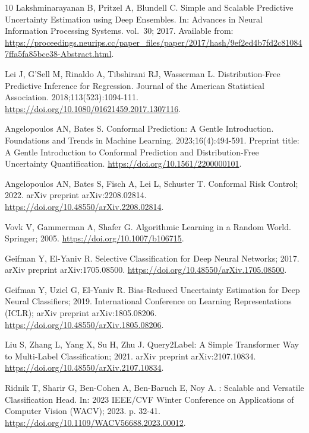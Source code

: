 \begin{thebibliography}{10}
Lakshminarayanan B, Pritzel A, Blundell C.
\newblock Simple and Scalable Predictive Uncertainty Estimation using Deep
  Ensembles.
\newblock In: Advances in Neural Information Processing Systems. vol.~30; 2017.
  Available from:
  \url{https://proceedings.neurips.cc/paper_files/paper/2017/hash/9ef2ed4b7fd2c810847ffa5fa85bce38-Abstract.html}.

Lei J, G'Sell M, Rinaldo A, Tibshirani RJ, Wasserman L.
\newblock Distribution-Free Predictive Inference for Regression.
\newblock Journal of the American Statistical Association.
  2018;113(523):1094-111.
\newblock \url{https://doi.org/10.1080/01621459.2017.1307116}.

Angelopoulos AN, Bates S.
\newblock Conformal Prediction: A Gentle Introduction.
\newblock Foundations and Trends in Machine Learning. 2023;16(4):494-591.
\newblock Preprint title: A Gentle Introduction to Conformal Prediction and
  Distribution-Free Uncertainty Quantification.
\newblock \url{https://doi.org/10.1561/2200000101}.

Angelopoulos AN, Bates S, Fisch A, Lei L, Schuster T. Conformal Risk Control;
  2022.
\newblock arXiv preprint arXiv:2208.02814.
\newblock \url{https://doi.org/10.48550/arXiv.2208.02814}.

Vovk V, Gammerman A, Shafer G.
\newblock Algorithmic Learning in a Random World.
\newblock Springer; 2005.
\newblock \url{https://doi.org/10.1007/b106715}.

Geifman Y, El-Yaniv R. Selective Classification for Deep Neural Networks; 2017.
\newblock arXiv preprint arXiv:1705.08500.
\newblock \url{https://doi.org/10.48550/arXiv.1705.08500}.

Geifman Y, Uziel G, El-Yaniv R. Bias-Reduced Uncertainty Estimation for Deep
  Neural Classifiers; 2019.
\newblock International Conference on Learning Representations (ICLR); arXiv
  preprint arXiv:1805.08206.
\newblock \url{https://doi.org/10.48550/arXiv.1805.08206}.

Liu S, Zhang L, Yang X, Su H, Zhu J. {Query2Label}: A Simple Transformer Way to
  Multi-Label Classification; 2021.
\newblock arXiv preprint arXiv:2107.10834.
\newblock \url{https://doi.org/10.48550/arXiv.2107.10834}.

Ridnik T, Sharir G, Ben-Cohen A, Ben-Baruch E, Noy A.
: Scalable and Versatile Classification Head.
\newblock In: 2023 IEEE/CVF Winter Conference on Applications of Computer
  Vision (WACV); 2023. p. 32-41.
\newblock \url{https://doi.org/10.1109/WACV56688.2023.00012}.


\end{thebibliography}
